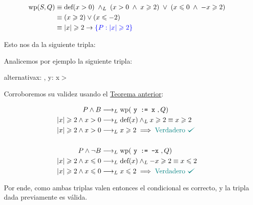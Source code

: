 \documentclass[../main.tex]{subfiles}
\begin{document}
\begin{align*}
    \text{wp}(S,Q) &\equiv \text{def}(x > 0)\;\land _L\;(x > 0\;\land\;x \geqslant 2)\;\lor\;(x \leqslant 0\;\land\;-x \geqslant 2) \\
                &\equiv (x \geqslant 2) \lor (x \leqslant -2) \\
                &\equiv |x| \geqslant 2 \rightarrow \text{\textcolor{blue}{\{$P: |x| \geqslant 2$\}}}
\end{align*}

Esto nos da la siguiente tripla:

Analicemos por ejemplo la siguiente tripla: \nln
\begin{proc}{alternativa}{\In x: \Z, \Out y: \Z}{}
     x\;$>$  \par
    \;\;   \par
              \par
    \;\;   \par
             \par
\end{proc} \label{alternative_example_triplet_2}

Corroboremos su validez usando el \hyperref[conditional_wp_theorem]{Teorema anterior}:

\begin{align*}
                 P \land B &\implicaLuego \T{wp}(\T{\mono{y := x}},Q) \\
    |x| \geq 2 \land x > 0 &\implicaLuego \T{def}(x) \yLuego x \geq 2 \equiv x \geq 2 \\ 
    |x| \geq 2 \land x > 0 &\implicaLuego x \geq 2 \implies \T{\textcolor{teal}{Verdadero \checkmark}}\\ 
                                                                                      \\
           P \land \neg B  &\implicaLuego \T{wp}(\T{\mono{y := -x}},Q) \\
    |x| \geq 2 \land x \leq 0 &\implicaLuego \T{def}(x) \yLuego -x \geq 2 \equiv x \leq 2 \\
    |x| \geq 2 \land x \leq 0 &\implicaLuego x \leq 2  \implies \T{\textcolor{teal}{Verdadero \checkmark}} \\ 
\end{align*}

Por ende, como ambas triplas valen entonces el condicional es correcto, y la tripla dada previamente es válida.
\end{document}
